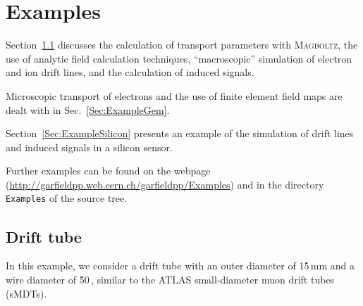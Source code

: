 \section{Examples}

Section~\ref{Sec:ExampleTube} discusses the 
calculation of transport parameters with \textsc{Magboltz}, 
the use of analytic field calculation techniques, 
``macroscopic'' simulation of electron and ion drift lines, 
and the calculation of induced signals. 
 
Microscopic transport of electrons and 
the use of finite element field maps are dealt with in 
Sec.~\ref{Sec:ExampleGem}. 

Section~\ref{Sec:ExampleSilicon} presents an example of 
the simulation of drift lines and induced signals in a 
silicon sensor.
 
Further examples can be found on the webpage 
(\url{http://garfieldpp.web.cern.ch/garfieldpp/Examples}) and 
in the directory \texttt{Examples} of the source tree.
 
\subsection{Drift tube}\label{Sec:ExampleTube}
In this example, we consider a drift tube with an outer diameter of 
15\,mm and a wire diameter of 50\,, similar to the 
ATLAS small-diameter muon drift tubes (sMDTs).

